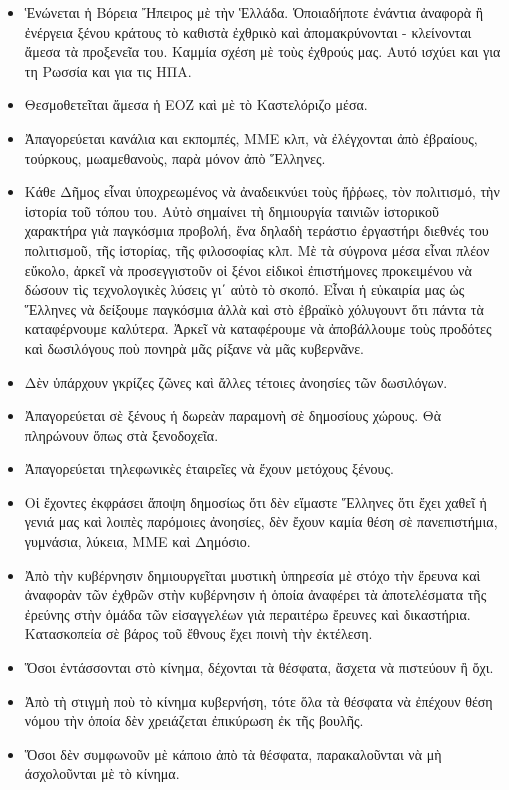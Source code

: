 \documentclass[a4paper]{article}
\begin{document}
\begin{itemize}
\item Ἑνώνεται ἡ Βόρεια Ἤπειρος μὲ τὴν Ἑλλάδα. Ὁποιαδήποτε ἐνάντια ἀναφορὰ ἢ ἐνέργεια ξένου κράτους τὸ καθιστὰ ἐχθρικὸ καὶ ἀπομακρύνονται - κλείνονται ἄμεσα τὰ προξενεῖα του. Καμμία σχέση μὲ τοὺς ἐχθρούς μας. Αυτό ισχύει και για τη Ρωσσία και για τις ΗΠΑ.
\item Θεσμοθετεῖται ἄμεσα ἡ ΕΟΖ καὶ μὲ τὸ Καστελόριζο μέσα.
\item Ἀπαγορεύεται κανάλια και εκπομπές, ΜΜΕ κλπ, νὰ ἐλέγχονται ἀπὸ ἐβραίους, τούρκους, μωαμεθανοὺς, παρὰ μόνον ἀπὸ Ἕλληνες.
\item Κάθε Δῆμος εἶναι ὑποχρεωμένος νὰ ἀναδεικνύει τοὺς ἤῤῥωες, τὸν πολιτισμό, τὴν ἱστορία τοῦ τόπου του. Αὐτὸ σημαίνει τὴ δημιουργία ταινιῶν ἱστορικοῦ χαρακτήρα γιὰ παγκόσμια προβολή, ἕνα δηλαδὴ τεράστιο ἐργαστήρι διεθνές του πολιτισμοῦ, τῆς ἱστορίας, τῆς φιλοσοφίας κλπ. Μὲ τὰ σύγρονα μέσα εἶναι πλέον εὔκολο, ἀρκεῖ νὰ προσεγγιστοῦν οἱ ξένοι εἰδικοὶ ἐπιστήμονες προκειμένου νὰ δώσουν τὶς τεχνολογικὲς λύσεις γι΄ αὐτὸ τὸ σκοπό. Εἶναι ἡ εὐκαιρία μας ὡς Ἕλληνες νὰ δείξουμε παγκόσμια ἀλλὰ καὶ στὸ ἐβραϊκὸ χόλυγουντ ὅτι πάντα τὰ καταφέρνουμε καλύτερα. Ἀρκεῖ νὰ καταφέρουμε νὰ ἀποβάλλουμε τοὺς προδότες καὶ δωσιλόγους ποὺ πονηρὰ μᾶς ρίξανε νὰ μᾶς κυβερνᾶνε.
\item Δὲν ὑπάρχουν γκρίζες ζῶνες καὶ ἄλλες τέτοιες ἀνοησίες τῶν δωσιλόγων.
\item Ἀπαγορεύεται σὲ ξένους ἡ δωρεὰν παραμονὴ σὲ δημοσίους χώρους. Θὰ πληρώνουν ὅπως στὰ ξενοδοχεῖα.
\item Ἀπαγορεύεται τηλεφωνικὲς ἑταιρεῖες νὰ ἔχουν μετόχους ξένους.
\item Οἱ ἔχοντες ἐκφράσει ἄποψη δημοσίως ὅτι δὲν εἴμαστε Ἕλληνες ὅτι ἔχει χαθεῖ ἡ γενιά μας καὶ λοιπὲς παρόμοιες ἀνοησίες, δὲν ἔχουν καμία θέση σὲ πανεπιστήμια, γυμνάσια, λύκεια, ΜΜΕ καὶ Δημόσιο.
\item Ἀπὸ τὴν κυβέρνησιν δημιουργεῖται μυστικὴ ὑπηρεσία μὲ στόχο τὴν ἔρευνα καὶ ἀναφορὰν τῶν ἐχθρῶν στὴν κυβέρνησιν ἡ ὁποία ἀναφέρει τὰ ἀποτελέσματα τῆς ἐρεύνης στὴν ὁμάδα τῶν εἰσαγγελέων γιὰ περαιτέρω ἔρευνες καὶ δικαστήρια. Κατασκοπεία σὲ βάρος τοῦ ἔθνους ἔχει ποινὴ τὴν ἐκτέλεση.
\item Ὅσοι ἐντάσσονται στὸ κίνημα, δέχονται τὰ θέσφατα, ἄσχετα νὰ πιστεύουν ἢ ὄχι.
\item Ἀπὸ τὴ στιγμὴ ποὺ τὸ κίνημα κυβερνήση, τότε ὅλα τὰ θέσφατα νὰ ἐπέχουν θέση νόμου τὴν ὁποία δὲν χρειάζεται ἐπικύρωση ἐκ τῆς βουλῆς.
\item Ὅσοι δὲν συμφωνοῦν μὲ κάποιο ἀπὸ τὰ θέσφατα, παρακαλοῦνται νὰ μὴ άσχολοῦνται μὲ τὸ κίνημα.

\end{itemize}
\end{document}
